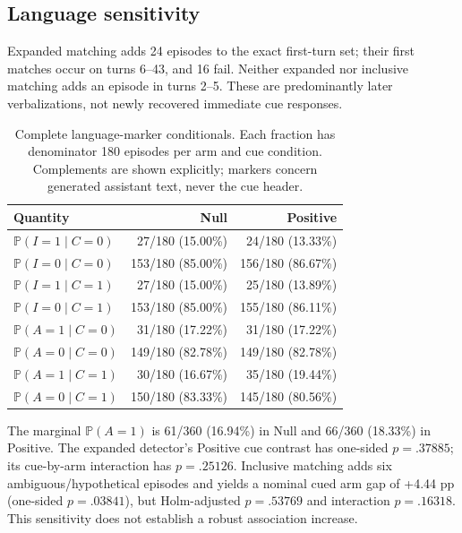 \documentclass[10pt,letterpaper]{article}
\newcommand{\pr}{\mathbb{P}}
\begin{document}
\subsection{Language sensitivity}\label{app:language}
Expanded matching adds 24 episodes to the exact first-turn set; their first matches occur on turns 6--43, and 16 fail. Neither expanded nor inclusive matching adds an episode in turns 2--5. These are predominantly later verbalizations, not newly recovered immediate cue responses.
\begin{table}[H]
\centering\small
\caption{Complete language-marker conditionals. Each fraction has denominator 180 episodes per arm and cue condition. Complements are shown explicitly; markers concern generated assistant text, never the cue header.}
\begin{tabular}{lrr}\toprule
Quantity & Null & Positive\\\midrule
$\pr(I=1\mid C=0)$ & 27/180 (15.00\%) & 24/180 (13.33\%)\\
$\pr(I=0\mid C=0)$ & 153/180 (85.00\%) & 156/180 (86.67\%)\\
$\pr(I=1\mid C=1)$ & 27/180 (15.00\%) & 25/180 (13.89\%)\\
$\pr(I=0\mid C=1)$ & 153/180 (85.00\%) & 155/180 (86.11\%)\\\midrule
$\pr(A=1\mid C=0)$ & 31/180 (17.22\%) & 31/180 (17.22\%)\\
$\pr(A=0\mid C=0)$ & 149/180 (82.78\%) & 149/180 (82.78\%)\\
$\pr(A=1\mid C=1)$ & 30/180 (16.67\%) & 35/180 (19.44\%)\\
$\pr(A=0\mid C=1)$ & 150/180 (83.33\%) & 145/180 (80.56\%)\\\bottomrule
\end{tabular}
\end{table}
The marginal $\pr(A=1)$ is 61/360 (16.94\%) in Null and 66/360 (18.33\%) in Positive. The expanded detector's Positive cue contrast has one-sided $p=.37885$; its cue-by-arm interaction has $p=.25126$. Inclusive matching adds six ambiguous/hypothetical episodes and yields a nominal cued arm gap of +4.44 pp (one-sided $p=.03841$), but Holm-adjusted $p=.53769$ and interaction $p=.16318$. This sensitivity does not establish a robust association increase.
\end{document}
